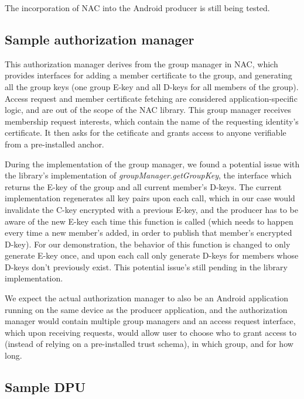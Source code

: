 \documentclass[letterpaper,twocolumn,11pt]{article}
\begin{document}
The incorporation of NAC into the Android producer is still being tested.

\subsection{Sample authorization manager}

This authorization manager derives from the group manager in NAC, which provides interfaces for adding a member certificate to the group, and generating all the group keys (one group E-key and all D-keys for all members of the group). Access request and member certificate fetching are considered application-specific logic, and are out of the scope of the NAC library. This group manager receives membership request interests, which contain the name of the requesting identity's certificate. It then asks for the cetificate and grants access to anyone verifiable from a pre-installed anchor.

During the implementation of the group manager, we found a potential issue with the library's implementation of \textit{groupManager.getGroupKey}, the interface which returns the E-key of the group and all current member's D-keys. The current implementation regenerates all key pairs upon each call, which in our case would invalidate the C-key encrypted with a previous E-key, and the producer has to be aware of the new E-key each time this function is called (which needs to happen every time a new member's added, in order to publish that member's encrypted D-key). For our demonstration, the behavior of this function is changed to only generate E-key once, and upon each call only generate D-keys for members whose D-keys don't previously exist. This potential issue's still pending in the library implementation.

We expect the actual authorization manager to also be an Android application running on the same device as the producer application, and the authorization manager would contain multiple group managers and an access request interface, which upon receiving requests, would allow user to choose who to grant access to (instead of relying on a pre-installed trust schema), in which group, and for how long.

\subsection{Sample DPU}
\end{document}

